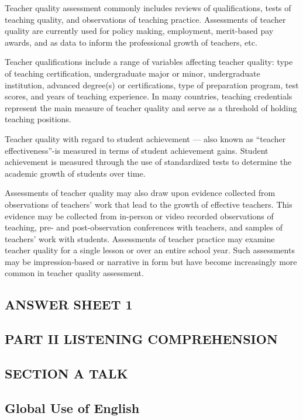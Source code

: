 \documentclass[UTF8,11pt]{ctexart}
\begin{document}
Teacher quality assessment commonly includes reviews of qualifications, tests of teaching quality, and observations of teaching practice. Assessments of teacher quality are currently used for policy making, employment, merit-based pay awards, and as data to inform the professional growth of teachers, etc.


Teacher qualifications include a range of variables affecting teacher quality: type of teaching certification, undergraduate major or minor, undergraduate institution, advanced degree(s) or certifications, type of preparation program, test scores, and years of teaching experience. In many countries, teaching credentials represent the main measure of teacher quality and serve as a threshold of holding teaching positions.


Teacher quality with regard to student achievement — also known as “teacher effectiveness”-is measured in terms of student achievement gains. Student achievement is measured through the use of standardized tests to determine the academic growth of students over time.


Assessments of teacher quality may also draw upon evidence collected from observations of teachers’ work that lead to the growth of effective teachers. This evidence may be collected from in-person or video recorded observations of teaching, pre- and post-observation conferences with teachers, and samples of teachers’ work with students. Assessments of teacher practice may examine teacher quality for a single lesson or over an entire school year. Such assessments may be impression-based or narrative in form but have become increasingly more common in teacher quality assessment.


\subsection*{\textbf{ANSWER SHEET 1}}


\subsection*{\textbf{PART II LISTENING COMPREHENSION}}


\subsection*{\textbf{SECTION A TALK}}


\subsection*{\textbf{Global Use of English}}
\end{document}
